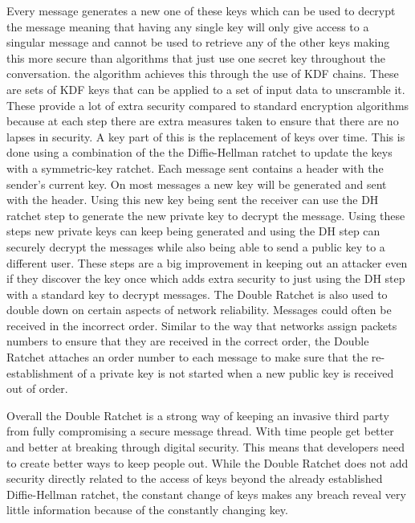 \documentclass{article}
\begin{document}
Every message generates a new one of these keys which can be used to decrypt the message meaning that having any single key will only give access to a singular message and cannot be used to retrieve any of the other keys making this more secure than algorithms that just use one secret key throughout the conversation. the algorithm achieves this through the use of KDF chains. These are sets of KDF keys that can be applied to a set of input data to unscramble it. These provide a lot of extra security compared to standard encryption algorithms because at each step there are extra measures taken to ensure that there are no lapses in security. A key part of this is the replacement of keys over time. This is done using a combination of the the Diffie-Hellman ratchet to update the keys with a symmetric-key ratchet. Each message sent contains a header with the sender's current key. On most messages a new key will be generated and sent with the header. Using this new key being sent the receiver can use the DH ratchet step to generate the new private key to decrypt the message. Using these steps new private keys can keep being generated and using the DH step can securely decrypt the messages while also being able to send a public key to a different user. These steps are a big improvement in keeping out an attacker even if they discover the key once which adds extra security to just using the DH step with a standard key to decrypt messages.\newline
 The Double Ratchet is also used to double down on certain aspects of network reliability. Messages could often be received in the incorrect order. Similar to the way that networks assign packets numbers to ensure that they are received in the correct order, the Double Ratchet attaches an order number to each message to make sure that the re-establishment of a private key is not started when a new public key is received out of order.\newline
 
 Overall the Double Ratchet is a strong way of keeping an invasive third party from fully compromising a secure message thread. With time people get better and better at breaking through digital security. This means that developers need to create better ways to keep people out. While the Double Ratchet does not add security directly related to the access of keys beyond the already established Diffie-Hellman ratchet, the constant change of keys makes any breach reveal very little information because of the constantly changing key.\newline
 
\end{document}
